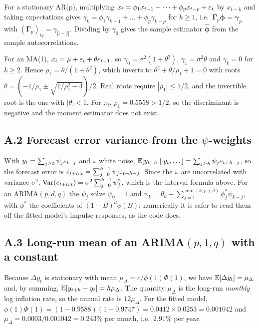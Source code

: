 For a stationary AR(p), multiplying $x_t=\phi_1x_{t-1}+\dots+\phi_px_{t-p}+\varepsilon_t$
by $x_{t-k}$ and taking expectations gives $\gamma_k=\phi_1\gamma_{k-1}+\dots+
\phi_p\gamma_{k-p}$ for $k\ge1$, i.e.\ $\bm\Gamma_p\bm\phi=\bm\gamma_p$ with
$(\bm\Gamma_p)_{ij}=\gamma_{|i-j|}$. Dividing by $\gamma_0$ gives the sample
estimator $\hat{\bm\phi}$ from the sample autocorrelations.

For an MA(1), $x_t=\mu+\varepsilon_t+\theta\varepsilon_{t-1}$, so $\gamma_0=\sigma^2(1+\theta^2)$,
$\gamma_1=\sigma^2\theta$ and $\gamma_k=0$ for $k\ge2$. Hence
$\rho_1=\theta/(1+\theta^2)$, which inverts to $\theta^2+\theta/\rho_1+1=0$ with
roots $\theta = (-1/\rho_1 \pm \sqrt{1/\rho_1^{2}-4})/2$. Real roots require
$|\rho_1|\le1/2$, and the invertible root is the one with $|\theta|<1$. For
$\pi_t$, $\rho_1=0.5558>1/2$, so the discriminant is negative and the moment
estimator does not exist.

\subsection*{A.2 Forecast error variance from the $\psi$-weights}

With $y_t=\sum_{j\ge0}\psi_j\varepsilon_{t-j}$ and $\varepsilon$ white noise,
$\mathbb{E}[y_{t+h}\mid y_t,\dots]=\sum_{j\ge h}\psi_j\varepsilon_{t+h-j}$, so the forecast error
is $e_{t+h|t}=\sum_{j=0}^{h-1}\psi_j\varepsilon_{t+h-j}$. Since the $\varepsilon$ are
uncorrelated with variance $\sigma^2$,
$\mathrm{Var}(e_{t+h|t})=\sigma^2\sum_{j=0}^{h-1}\psi_j^2$, which is
the interval formula above. For an ARIMA$(p,d,q)$ the $\psi_j$ solve
$\psi_0=1$ and $\psi_k=\theta_k-\sum_{j=1}^{\min(k,p+d)}\phi^{*}_j\psi_{k-j}$, with
$\phi^{*}$ the coefficients of $(1-B)^d\phi(B)$; numerically it is safer to read
them off the fitted model's impulse responses, as the code does.

\subsection*{A.3 Long-run mean of an ARIMA$(p,1,q)$ with a constant}

Because $\Delta y_t$ is stationary with mean $\mu_\Delta = c/\phi(1)\Phi(1)$,
we have $\mathbb{E}[\Delta y_t]=\mu_\Delta$ and, by summing, $\mathbb{E}[y_{t+h}-y_t]=h\mu_\Delta$.
The quantity $\mu_\Delta$ is the long-run \emph{monthly} log inflation rate, so the
annual rate is $12\mu_\Delta$. For the fitted model,
$\phi(1)\Phi(1)=(1-0.9588)(1-0.9747)=0.0412\times0.0253=0.001042$ and
$\mu_\Delta = 0.0003/0.001042 = 0.243\%$ per month, i.e.\ $2.91\%$ per year.

